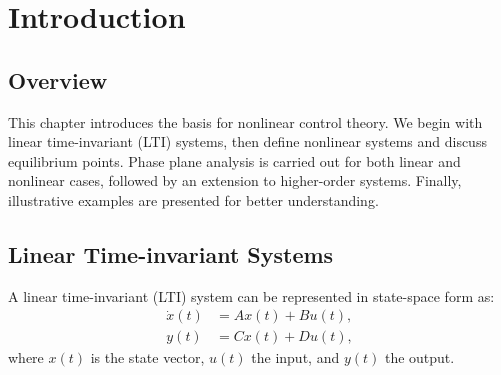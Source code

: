 \chapterspaceabove{6.75cm} %
\chapterspacebelow{7.25cm} %

\chapter{Introduction}

\section{Overview}
This chapter introduces the basis for nonlinear control theory. We begin with linear time-invariant (LTI) systems, then define nonlinear systems and discuss equilibrium points. Phase plane analysis is carried out for both linear and nonlinear cases, followed by an extension to higher-order systems. Finally, illustrative examples are presented for better understanding.

\section{Linear Time-invariant Systems}
\begin{definition}
A linear time-invariant (LTI) system can be represented in state-space form as:
\begin{align}
    \dot{x}(t) &= A x(t) + B u(t), \\
    y(t) &= C x(t) + D u(t),
\end{align}
where $x(t)$ is the state vector, $u(t)$ the input, and $y(t)$ the output.
\end{definition}

